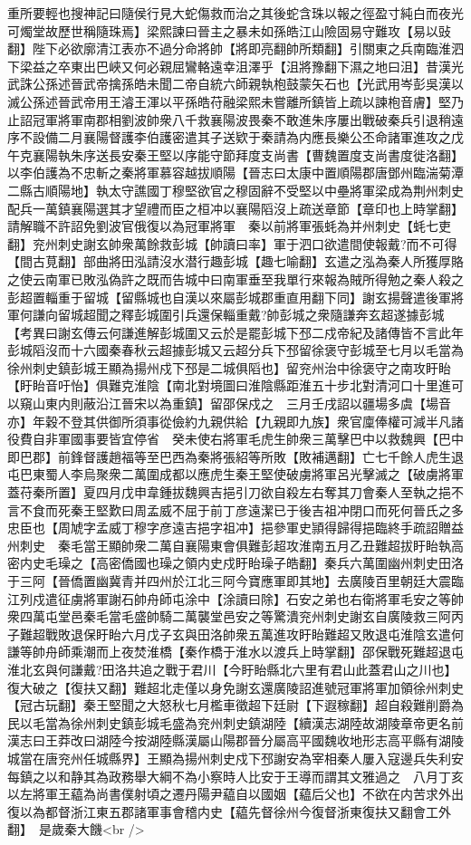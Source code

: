 重所要輕也搜神記曰隨侯行見大蛇傷救而治之其後蛇含珠以報之徑盈寸純白而夜光可燭堂故歷世稱隨珠焉】梁熙諫曰晉主之暴未如孫皓江山險固易守難攻【易以䜴翻】陛下必欲廓清江表亦不過分命將帥【將即亮翻帥所類翻】引關東之兵南臨淮泗下梁益之卒東出巴峽又何必親屈鸞輅遠幸沮澤乎【沮將豫翻下濕之地曰沮】昔漢光武誅公孫述晉武帝擒孫皓未聞二帝自統六師親執枹鼓蒙矢石也【光武用岑彭吳漢以滅公孫述晉武帝用王濬王渾以平孫皓苻融梁熙未嘗離所鎮皆上疏以諫枹音膚】堅乃止詔冠軍將軍南郡相劉波帥衆八千救襄陽波畏秦不敢進朱序屢出戰破秦兵引退稍遠序不設備二月襄陽督護李伯護密遣其子送欵于秦請為内應長樂公丕命諸軍進攻之戊午克襄陽執朱序送長安秦王堅以序能守節拜度支尚書【曹魏置度支尚書度徙洛翻】以李伯護為不忠斬之秦將軍慕容越拔順陽【晉志曰太康中置順陽郡唐鄧州臨湍菊潭二縣古順陽地】執太守譙國丁穆堅欲官之穆固辭不受堅以中壘將軍梁成為荆州刺史配兵一萬鎮襄陽選其才望禮而臣之桓冲以襄陽䧟沒上疏送章節【章印也上時掌翻】請解職不許詔免劉波官俄復以為冠軍將軍　秦以前將軍張蚝為并州刺史【蚝七吏翻】兖州刺史謝玄帥衆萬餘救彭城【帥讀曰率】軍于泗口欲遣間使報戴?而不可得【間古莧翻】部曲將田泓請沒水潜行趣彭城【趣七喻翻】玄遣之泓為秦人所獲厚賂之使云南軍已敗泓偽許之既而告城中曰南軍垂至我單行來報為賊所得勉之秦人殺之彭超置輜重于留城【留縣城也自漢以來屬彭城郡重直用翻下同】謝玄揚聲遣後軍將軍何謙向留城超聞之釋彭城圍引兵還保輜重戴?帥彭城之衆隨謙奔玄超遂據彭城　【考異曰謝玄傳云何謙進解彭城圍又云於是罷彭城下邳二戍帝紀及諸傳皆不言此年彭城䧟沒而十六國秦春秋云超據彭城又云超分兵下邳留徐褒守彭城至七月以毛當為徐州刺史鎮彭城王顯為揚州戍下邳是二城俱䧟也】留兖州治中徐褒守之南攻盱眙【盱眙音吁怡】俱難克淮陰【南北對境圖曰淮陰縣距淮五十步北對清河口十里進可以窺山東内則蔽沿江晉宋以為重鎮】留邵保戍之　三月壬戌詔以疆場多虞【場音亦】年穀不登其供御所須事從儉約九親供給【九親即九族】衆官廩俸權可減半凡諸役費自非軍國事要皆宜停省　癸未使右將軍毛虎生帥衆三萬擊巴中以救魏興【巴中即巴郡】前鋒督護趙福等至巴西為秦將張紹等所敗【敗補邁翻】亡七千餘人虎生退屯巴東蜀人李烏聚衆二萬圍成都以應虎生秦王堅使破虜將軍呂光擊滅之【破虜將軍蓋苻秦所置】夏四月戊申韋鍾拔魏興吉挹引刀欲自殺左右奪其刀會秦人至執之挹不言不食而死秦王堅歎曰周孟威不屈于前丁彦遠潔已于後吉祖冲閉口而死何晉氏之多忠臣也【周虓字孟威丁穆字彦遠吉挹字祖冲】挹參軍史頴得歸得挹臨終手疏詔贈益州刺史　秦毛當王顯帥衆二萬自襄陽東會俱難彭超攻淮南五月乙丑難超拔盱眙執高密内史毛璪之【高密僑國也璪之領内史戍盱眙璪子皓翻】秦兵六萬圍幽州刺史田洛于三阿【晉僑置幽冀青并四州於江北三阿今寶應軍即其地】去廣陵百里朝廷大震臨江列戍遣征虜將軍謝石帥舟師屯涂中【涂讀曰除】石安之弟也右衛將軍毛安之等帥衆四萬屯堂邑秦毛當毛盛帥騎二萬襲堂邑安之等驚潰兖州刺史謝玄自廣陵救三阿丙子難超戰敗退保盱眙六月戊子玄與田洛帥衆五萬進攻盱眙難超又敗退屯淮陰玄遣何謙等帥舟師乘潮而上夜焚淮橋【秦作橋于淮水以渡兵上時掌翻】邵保戰死難超退屯淮北玄與何謙戴?田洛共追之戰于君川【今盱眙縣北六里有君山此蓋君山之川也】復大破之【復扶又翻】難超北走僅以身免謝玄還廣陵詔進號冠軍將軍加領徐州刺史【冠古玩翻】秦王堅聞之大怒秋七月檻車徵超下廷尉【下遐稼翻】超自殺難削爵為民以毛當為徐州刺史鎮彭城毛盛為兖州刺史鎮湖陸【續漢志湖陸故湖陵章帝更名前漢志曰王莽改曰湖陸今按湖陸縣漢屬山陽郡晉分屬高平國魏收地形志高平縣有湖陵城當在唐兖州任城縣界】王顯為揚州刺史戍下邳謝安為宰相秦人屢入寇邊兵失利安每鎮之以和静其為政務舉大綱不為小察時人比安于王導而謂其文雅過之　八月丁亥以左將軍王藴為尚書僕射頃之遷丹陽尹藴自以國姻【藴后父也】不欲在内苦求外出復以為都督浙江東五郡諸軍事會稽内史【藴先督徐州今復督浙東復扶又翻會工外翻】　是歲秦大饑<br />

